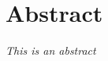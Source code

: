 \chapter*{ \centering Abstract} 

\vspace*{5\baselineskip}

\begin{large}
\textit{This is an abstract}
\end{large}


